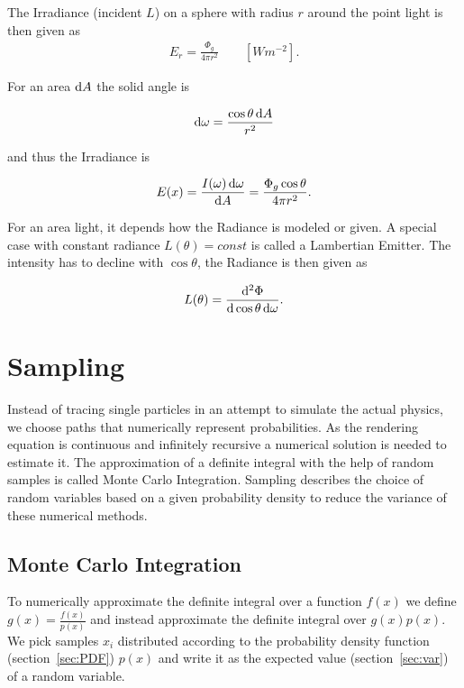 The Irradiance (incident $L$) on a sphere with radius $r$ around the point light is then given as
\begin{align}
E_r =  \frac{\Phi_g}{4\pi r^2} \qquad [ W m^{-2} ] .
\end{align}

For an area $\mathop{}\!\mathrm{d} A$ the solid angle is 

\begin{align}
\mathop{}\!\mathrm{d} \omega = \frac{\cos \theta \mathop{}\!\mathrm{d} A}{r^2}  
\end{align}


and thus the Irradiance is

\begin{align}
E(x) = \frac{ I(\omega) \mathop{}\!\mathrm{d} \omega }{ \mathop{}\!\mathrm{d} A } = \frac{ \Phi_g \cos \theta }{ 4 \pi r^2}.
\end{align}

For an area light, it depends how the Radiance is modeled or given. A special case with constant radiance $L(\theta) = const$ is called a Lambertian Emitter. The intensity has to decline with $\cos\theta$, the Radiance is then given as 

\begin{align}
L(\theta) = \frac{\mathop{}\!\mathrm{d}^2\Phi}{\mathop{}\!\mathrm{d}\cos\theta\mathop{}\!\mathrm{d}\omega}.
\end{align}



\section{Sampling}

Instead of tracing single particles in an attempt to simulate the actual physics, we choose paths that numerically represent probabilities. As the rendering equation is continuous and infinitely recursive a numerical solution is needed to estimate it. The approximation of a definite integral with the help of random samples is called Monte Carlo Integration. Sampling describes the choice of random variables based on a given probability density to reduce the variance of these numerical methods.

\subsection{Monte Carlo Integration}
\label{sec:montecarlo}
\label{sec:MC}

To numerically approximate the definite integral over a function $f(x)$ we define $g(x) = \frac{f(x)}{p(x)}$ and instead approximate the definite integral over $g(x)p(x)$. We pick samples $x_i$ distributed according to the probability density function (section~\ref{sec:PDF}) $p(x)$ and write it as the expected value (section~\ref{sec:var}) of a random variable.

